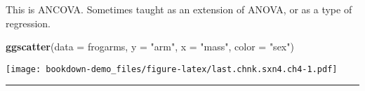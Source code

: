 \documentclass[]{book}
\newenvironment{Shaded}{\begin{snugshade}}{\end{snugshade}}
\newcommand{\KeywordTok}[1]{\textcolor[rgb]{0.13,0.29,0.53}{\textbf{#1}}}
\newcommand{\DataTypeTok}[1]{\textcolor[rgb]{0.13,0.29,0.53}{#1}}
\newcommand{\StringTok}[1]{\textcolor[rgb]{0.31,0.60,0.02}{#1}}
\newcommand{\NormalTok}[1]{#1}
\theoremstyle{definition}
\theoremstyle{definition}
\theoremstyle{definition}
\theoremstyle{remark}
\begin{document}
This is ANCOVA. Sometimes taught as an extension of ANOVA, or as a type
of regression.

\begin{Shaded}
\begin{Highlighting}[]
\KeywordTok{ggscatter}\NormalTok{(}\DataTypeTok{data =}\NormalTok{ frogarms,}
          \DataTypeTok{y =} \StringTok{"arm"}\NormalTok{,}
          \DataTypeTok{x =} \StringTok{"mass"}\NormalTok{,}
          \DataTypeTok{color =} \StringTok{"sex"}\NormalTok{)}
\end{Highlighting}
\end{Shaded}

\texttt{[image: bookdown-demo\_files/figure-latex/last.chnk.sxn4.ch4-1.pdf]}

\begin{center}\rule{0.5\linewidth}{\linethickness}\end{center}


\end{document}
